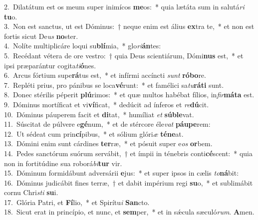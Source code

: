 {2.~}Dilatátum est os meum super inimícos \textbf{me}os:~* quia lætáta sum in salutá\textit{ri} \textbf{tu}o.\\
{3.~}Non est sanctus, ut est Dóminus:~† neque enim est álius \textbf{ex}tra te,~* et non est fortis sicut De\textit{us} \textbf{no}ster.\\
{4.~}Nolíte multiplicáre loqui su\textbf{blí}mia,~* glo\textit{ri}\textbf{án}tes:\\
{5.~}Recédant vétera de ore vestro:~† quia Deus scientiárum, Dómi\textbf{nus} est,~* et ipsi præparántur cogita\textit{ti}\textbf{ó}nes.\\
{6.~}Arcus fórtium supe\textbf{rá}tus est,~* et infírmi accíncti \textit{sunt} \textbf{ró}\textbf{bo}re.\\
{7.~}Repléti prius, pro pánibus se loca\textbf{vé}runt:~* et famélici sa\textit{tu}\textbf{rá}\textbf{ti} sunt.\\
{8.~}Donec stérilis péperit \textbf{plú}rimos:~* et quæ multos habébat fílios, in\textit{fir}\textbf{má}\textbf{ta} est.\\
{9.~}Dóminus mortíficat et vi\textbf{ví}ficat,~* dedúcit ad ínferos et \textit{re}\textbf{dú}cit.\\
{10.~}Dóminus páuperem facit et \textbf{di}tat,~* humíliat \textit{et} \textbf{sú}\textbf{ble}vat.\\
{11.~}Súscitat de púlvere e\textbf{gé}num,~* et de stércore éle\textit{vat} \textbf{páu}\textbf{pe}rem:\\
{12.~}Ut sédeat cum prin\textbf{cí}pibus,~* et sólium glóri\textit{æ} \textbf{té}\textbf{ne}at.\\
{13.~}Dómini enim sunt cárdines \textbf{ter}ræ,~* et pósuit super e\textit{os} \textbf{or}bem.\\
{14.~}Pedes sanctórum suórum servábit,~† et ímpii in ténebris conti\textbf{cé}scent:~* quia non in fortitúdine sua roborá\textit{bi}\textbf{tur} vir.\\
{15.~}Dóminum formidábunt adversárii \textbf{e}jus:~* et super ipsos in cælis \textit{to}\textbf{ná}bit:\\
{16.~}Dóminus judicábit fines terræ,~† et dabit impérium regi \textbf{su}o,~* et sublimábit cornu Chri\textit{sti} \textbf{su}i.\\
{17.~}Glória Patri, et \textbf{Fí}lio,~* et Spirítu\textit{i} \textbf{San}cto.\\
{18.~}Sicut erat in princípio, et nunc, et \textbf{sem}per,~* et in sǽcula sæculó\textit{rum}. \textbf{A}men.\\
